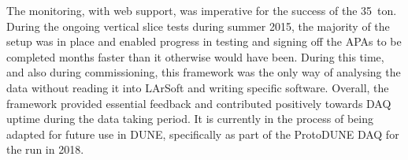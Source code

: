 The monitoring, with web support, was imperative for the success of the 35~ton.  During the ongoing vertical slice tests during summer 2015, the majority of the setup was in place and enabled progress in testing and signing off the APAs to be completed months faster than it otherwise would have been.  During this time, and also during commissioning, this framework was the only way of analysing the data without reading it into LArSoft and writing specific software.  Overall, the framework provided essential feedback and contributed positively towards DAQ uptime during the data taking period.  It is currently in the process of being adapted for future use in DUNE, specifically as part of the ProtoDUNE DAQ for the run in 2018.
